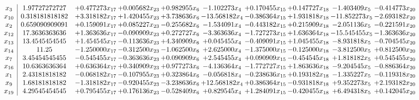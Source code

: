 \documentclass[10pt]{article}
\begin{document}
 \[\begin{array}{c| c c@{\hskip 2pt} c@{\hskip 2pt} c@{\hskip 2pt} c@{\hskip 2pt} c@{\hskip 2pt} c@{\hskip 2pt} c@{\hskip 2pt} c@{\hskip 2pt} }
 x_{3}   &  1.97727272727 & + 0.477273 x_{17} & + 0.005682 x_{23} & + 0.982955 x_{6} & -1.102273 x_{4} & + 0.170455 x_{15} & + 0.147727 x_{18} & -1.403409 x_{5} & -0.414773 x_{20}\\
 x_{10}   &  0.318181818182 & + 3.318182 x_{17} & + 1.420455 x_{23} & + 3.738636 x_{6} & -13.568182 x_{4} & -0.386364 x_{15} & + 1.931818 x_{18} & -11.852273 x_{5} & -2.693182 x_{20}\\
 x_{2}   &  0.659090909091 & + 0.159091 x_{17} & + 0.085227 x_{23} & -0.255682 x_{6} & -1.534091 x_{4} & -0.443182 x_{15} & + 0.215909 x_{18} & -2.051136 x_{5} & -0.221591 x_{20}\\
 x_{12}   &  17.3636363636 & + 1.363636 x_{17} & -0.090909 x_{23} & + 0.272727 x_{6} & -3.363636 x_{4} & -1.727273 x_{15} & + 1.636364 x_{18} & -15.545455 x_{5} & -1.363636 x_{20}\\
 x_{13}   &  13.4545454545 & + 1.454545 x_{17} & -0.113636 x_{23} & + 4.340909 x_{6} & + 0.045455 x_{4} & -0.409091 x_{15} & + 1.045455 x_{18} & -8.931818 x_{5} & -0.704545 x_{20}\\
 x_{14}   &  11.25 & -1.250000 x_{17} & -0.312500 x_{23} & -1.062500 x_{6} & + 2.625000 x_{4} & -1.375000 x_{15} & -0.125000 x_{18} & -3.812500 x_{5} & + 0.812500 x_{20}\\
 x_{7}   &  3.45454545455 & -0.545455 x_{17} & -0.363636 x_{23} & + 0.090909 x_{6} & + 2.545455 x_{4} & + 0.090909 x_{15} & -0.454545 x_{18} & + 1.818182 x_{5} & + 0.545455 x_{20}\\
 x_{16}   &  10.6363636364 & + 0.636364 x_{17} & + 0.340909 x_{23} & + 0.977273 x_{6} & -4.136364 x_{4} & -1.772727 x_{15} & + 1.863636 x_{18} & -9.204545 x_{5} & -0.886364 x_{20}\\
 x_{1}   &  2.43181818182 & -0.068182 x_{17} & -0.107955 x_{23} & + 0.323864 x_{6} & -0.056818 x_{4} & -0.238636 x_{15} & + 0.193182 x_{18} & -1.335227 x_{5} & -0.119318 x_{20}\\
 x_{9}   &  1.68181818182 & -1.318182 x_{17} & -0.920455 x_{23} & -3.238636 x_{6} & + 12.568182 x_{4} & + 0.386364 x_{15} & -0.931818 x_{18} & + 9.352273 x_{5} & + 2.193182 x_{20}\\
 x_{19}   &  4.29545454545 & + 0.795455 x_{17} & + 0.176136 x_{23} & -0.528409 x_{6} & + 0.829545 x_{4} & + 1.284091 x_{15} & -0.420455 x_{18} & + 6.494318 x_{5} & + 0.142045 x_{20}\\

\end{array}\]
\end{document}
